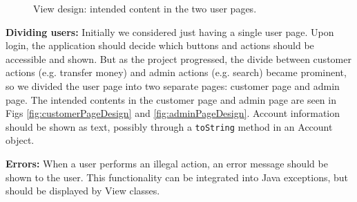 \begin{figure}[H]
\caption{View design: intended content in the two user pages.}
\end{figure}

\textbf{Dividing users:} Initially we considered just having a single user page. Upon login, the application should decide which buttons and actions should be accessible and shown. But as the project progressed, the divide between customer actions (e.g. transfer money) and admin actions (e.g. search) became prominent, so we divided the user page into two separate pages: customer page and admin page. The intended contents in the customer page and admin page are seen in Figs \ref{fig:customerPageDesign} and \ref{fig:adminPageDesign}. Account information should be shown as text, possibly through a \texttt{toString} method in an Account object.

\textbf{Errors:} When a user performs an illegal action, an error message should be shown to the user. This functionality can be integrated into Java exceptions, but should be displayed by View classes.